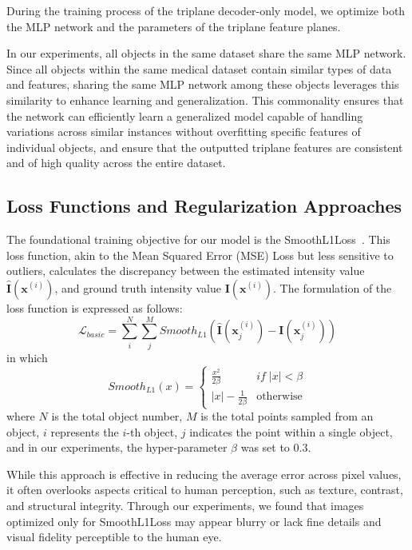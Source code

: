\documentclass[letterpaper]{article} %
\begin{document}
During the training process of the triplane decoder-only model, we optimize both the MLP network and the parameters of the triplane feature planes. 

In our experiments, all objects in the same dataset share the same MLP network. Since all objects within the same medical dataset contain similar types of data and features, sharing the same MLP network among these objects leverages this similarity to enhance learning and generalization. This commonality ensures that the network can efficiently learn a generalized model capable of handling variations across similar instances without overfitting specific features of individual objects, and ensure that the outputted triplane features are consistent and of high quality across the entire dataset. 

\subsection{Loss Functions and Regularization Approaches}
\label{m1}

The foundational training objective for our model is the SmoothL1Loss~\cite{girshick2015fast}. This loss function, akin to the Mean Squared Error (MSE) Loss but less sensitive to outliers, calculates the discrepancy between the estimated intensity value $\mathbf{\widehat{I}}(\mathbf{x}^{(i)})$, and ground truth intensity value $\mathbf{I}(\mathbf{x}^{(i)})$. The formulation of the loss function is expressed as follows:
\begin{equation}
    \mathcal{L}_{basic} = \sum^N_i\sum^M_j{Smooth_{L1}\left(\mathbf{\widehat{I}}\left(\mathbf{x}^{(i)}_j\right)- \mathbf{I}\left(\mathbf{x}^{(i)}_j\right)\right)}
\end{equation}
in which
\begin{equation}
Smooth_{L1}(x) = \left\{ 
\begin{array}{ll}
\frac{x^2}{2\beta} & if\; |x| < \beta \\
|x| - \frac{1}{2\beta} & \text{otherwise}
\end{array}
\right.
\end{equation}
where $N$ is the total object number, $M$ is the total points sampled from an object, $i$ represents the $i$-th object, $j$ indicates the point within a single object, and in our experiments, the hyper-parameter $\beta$ was set to 0.3. 

While this approach is effective in reducing the average error across pixel values, it often overlooks aspects critical to human perception, such as texture, contrast, and structural integrity. Through our experiments, we found that images optimized only for SmoothL1Loss may appear blurry or lack fine details and visual fidelity perceptible to the human eye. 
\end{document}
